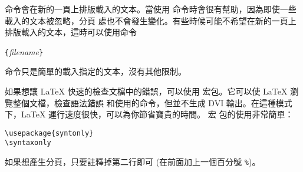  命令會在新的一頁上排版載入的文本。當使用  命令時會很有幫助，因為即使一些載入的文本被忽略，分頁
處也不會發生變化。有些時候可能不希望在新的一頁上排版載入的文本，這時可以使用命令
\begin{lscommand}
\verb|{|\emph{filename}\verb|}|
\end{lscommand}
\noindent%
 命令只是簡單的載入指定的文本，沒有其他限制。


如果想讓 \LaTeX{} 快速的檢查文檔中的錯誤，可以使用  宏包。它可以使 \LaTeX{} 瀏覽整個文檔，檢查語法錯誤
和使用的命令，但並不生成 DVI 輸出。在這種模式下，\LaTeX{} 運行速度很快，可以為你節省寶貴的時間。 宏
包的使用非常簡單：
\begin{verbatim}
\usepackage{syntonly}
\syntaxonly
\end{verbatim}
如果想產生分頁，只要註釋掉第二行即可 (在前面加上一個百分號 \verb|%|)。


%


